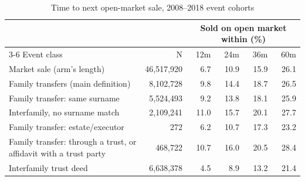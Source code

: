 \begin{table}[!t]\centering
\caption{Time to next open-market sale, 2008--2018 event cohorts}
\label{tab:hazard}
{\small
\begin{tabular}{lrrrrr}
\toprule
 & & \multicolumn{4}{c}{Sold on open market within (\%)} \\
\cmidrule(lr){3-6}
Event class & N & 12m & 24m & 36m & 60m \\
\midrule
Market sale (arm's length) & 46,517,920 & 6.7 & 10.9 & 15.9 & 26.1 \\
Family transfers (main definition) & 8,102,728 & 9.8 & 14.4 & 18.7 & 26.5 \\
Family transfer: same surname & 5,524,493 & 9.2 & 13.8 & 18.1 & 25.9 \\
Interfamily, no surname match & 2,109,241 & 11.0 & 15.7 & 20.1 & 27.7 \\
Family transfer: estate/executor & 272 & 6.2 & 10.7 & 17.3 & 23.2 \\
Family transfer: through a trust, or affidavit with a trust party & 468,722 & 10.7 & 16.0 & 20.5 & 28.4 \\
Interfamily trust deed & 6,638,378 & 4.5 & 8.9 & 13.2 & 21.4 \\
\bottomrule
\end{tabular}}
\begin{minipage}{0.9\textwidth}\end{minipage}
\end{table}
